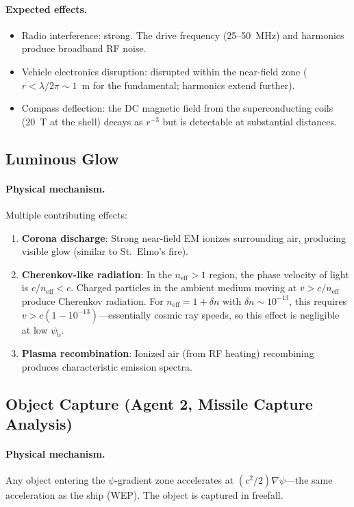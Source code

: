 \documentclass[12pt,aps,prd,superscriptaddress,nofootinbib,longbibliography]{revtex4-2}
\newcommand{\neff}{n_{\mathrm{eff}}}
\newcommand{\psib}{\psi_{\mathrm{b}}}
\begin{document}
\paragraph{Expected effects.}
\begin{itemize}
\item Radio interference: strong.  The drive frequency (25--50~MHz) and
harmonics produce broadband RF noise.
\item Vehicle electronics disruption: disrupted within the near-field
zone ($r < \lambda/2\pi \sim 1$~m for the fundamental; harmonics
extend further).
\item Compass deflection: the DC magnetic field from the superconducting
coils (20~T at the shell) decays as $r^{-3}$ but is detectable at
substantial distances.
\end{itemize}

\subsection{Luminous Glow}

\paragraph{Physical mechanism.}
Multiple contributing effects:
\begin{enumerate}
\item \textbf{Corona discharge}: Strong near-field EM ionizes
surrounding air, producing visible glow (similar to St.\ Elmo's fire).
\item \textbf{Cherenkov-like radiation}: In the $\neff > 1$ region, the
phase velocity of light is $c/\neff < c$.  Charged particles in the
ambient medium moving at $v > c/\neff$ produce Cherenkov radiation.
For $\neff = 1 + \delta n$ with $\delta n \sim 10^{-13}$, this requires
$v > c(1 - 10^{-13})$---essentially cosmic ray speeds, so this effect
is negligible at low $\psib$.
\item \textbf{Plasma recombination}: Ionized air (from RF heating)
recombining produces characteristic emission spectra.
\end{enumerate}

\subsection{Object Capture (Agent 2, Missile Capture Analysis)}

\paragraph{Physical mechanism.}
Any object entering the $\psi$-gradient zone accelerates at
$(c^2/2)\nabla\psi$---the same acceleration as the ship (WEP).
The object is captured in freefall.
\end{document}
